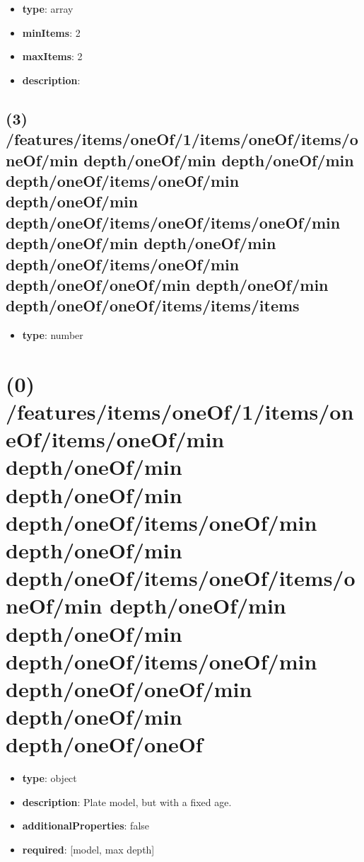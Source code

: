 \begin{itemize}[leftmargin=2em]\item {\bf type}: array
\item {\bf minItems}: 2
\item {\bf maxItems}: 2
\item {\bf description}: 
\end{itemize}\subsection{(3) /features/items/oneOf/1/items/oneOf/items/oneOf/min depth/oneOf/min depth/oneOf/min depth/oneOf/items/oneOf/min depth/oneOf/min depth/oneOf/items/oneOf/items/oneOf/min depth/oneOf/min depth/oneOf/min depth/oneOf/items/oneOf/min depth/oneOf/oneOf/min depth/oneOf/min depth/oneOf/oneOf/items/items/items}
\begin{itemize}[leftmargin=3em]\item {\bf type}: number
\end{itemize}\section{(0) /features/items/oneOf/1/items/oneOf/items/oneOf/min depth/oneOf/min depth/oneOf/min depth/oneOf/items/oneOf/min depth/oneOf/min depth/oneOf/items/oneOf/items/oneOf/min depth/oneOf/min depth/oneOf/min depth/oneOf/items/oneOf/min depth/oneOf/oneOf/min depth/oneOf/min depth/oneOf/oneOf}
\begin{itemize}[leftmargin=0em]\item {\bf type}: object
\item {\bf description}: Plate model, but with a fixed age.
\item {\bf additionalProperties}: false
\item {\bf required}: [model, max depth]\end{itemize}
